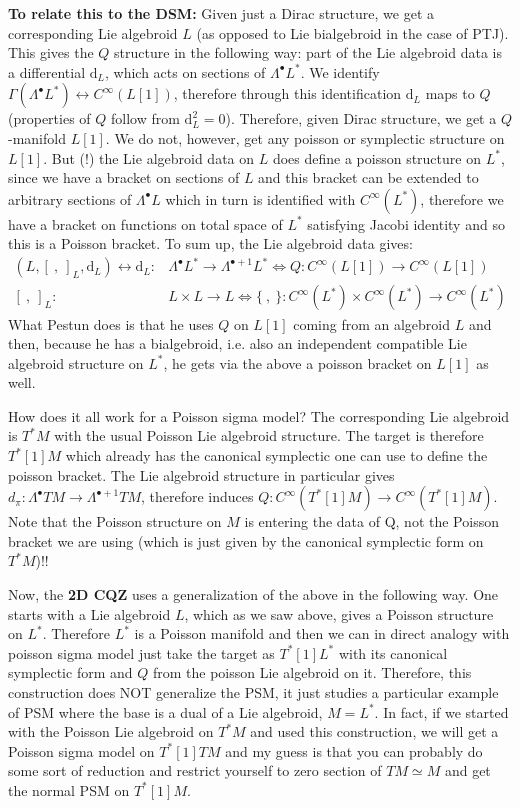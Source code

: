 \documentclass{article}
\newcommand{\brac}{[\ ,\ ]}
\newcommand{\bracp}{\{\ ,\ \}}
\newcommand{\rd}{\mathrm{d}}
\newcommand{\se}{\Gamma}
\theoremstyle{definition}
\theoremstyle{definition}
\theoremstyle{remark}
\theoremstyle{ref}
\begin{document}
{\bf To relate this to the DSM:} Given just a Dirac structure, we get a corresponding Lie algebroid $L$ (as opposed to Lie bialgebroid in the case of PTJ). This gives the $Q$ structure in the following way: part of the Lie algebroid data is a differential $\rd_L$, which acts on sections of $\Lambda^\bullet L^*$. We identify $\se(\Lambda^\bullet L^*) \leftrightarrow C^\infty(L[1])$, therefore through this identification $\rd_L$ maps to $Q$ (properties of $Q$ follow from $\rd_L^2=0$). Therefore, given Dirac structure, we get a $Q$-manifold $L[1]$. We do not, however, get any poisson or symplectic structure on $L[1]$. But (!) the Lie algebroid data on $L$ does define a poisson structure on $L^*$, since we have a bracket on sections of $L$ and this bracket can be extended to arbitrary sections of $\Lambda^\bullet L$ which in turn is identified with $C^\infty(L^*)$, therefore we have a bracket on functions on total space of $L^*$ satisfying Jacobi identity and so this is a Poisson bracket. To sum up, the Lie algebroid data gives:
\begin{align*}
(L,\brac_L,\rd_L)\leftrightarrow \rd_L:& \Lambda^\bullet L^*\rightarrow \Lambda^{\bullet+1} L^* \Leftrightarrow Q: C^\infty(L[1]) \rightarrow C^\infty(L[1])\\
\brac_L:& L \times L \rightarrow L \Leftrightarrow \bracp: C^\infty(L^*) \times C^\infty(L^*) \rightarrow C^\infty(L^*)
\end{align*}
What Pestun does is that he uses $Q$ on $L[1]$ coming from an algebroid $L$ and then, because he has a bialgebroid, i.e. also an independent compatible Lie algebroid structure on $L^*$, he gets via the above a poisson bracket on $L[1]$ as well.

How does it all work for a Poisson sigma model? The corresponding Lie algebroid is $T^*M$ with the usual Poisson Lie algebroid structure. The target is therefore $T^*[1]M$ which already has the canonical symplectic one can use to define the poisson bracket. The Lie algebroid structure in particular gives $d_\pi: \Lambda^\bullet TM\rightarrow \Lambda^{\bullet+1} TM$, therefore induces $Q: C^\infty(T^*[1]M)\rightarrow C^\infty(T^*[1]M)$. Note that the Poisson structure on $M$ is entering the data of Q, not the Poisson bracket we are using (which is just given by the canonical symplectic form on $T^*M$)!!

Now, the {\bf 2D CQZ} uses a generalization of the above in the following way. One starts with a Lie algebroid $L$, which as we saw above, gives a Poisson structure on $L^*$. Therefore $L^*$ is a Poisson manifold and then we can in direct analogy with poisson sigma model just take the target as $T^*[1]L^*$ with its canonical symplectic form and $Q$ from the poisson Lie algebroid on it. Therefore, this construction does NOT generalize the PSM, it just studies a particular example of PSM where the base is a dual of a Lie algebroid, $M=L^*$. In fact, if we started with the Poisson Lie algebroid on $T^*M$ and used this construction, we will get a Poisson sigma model on $T^*[1]TM$ and my guess is that you can probably do some sort of reduction and restrict yourself to zero section of $TM\simeq M$ and get the normal PSM on $T^*[1]M$.
\end{document}

